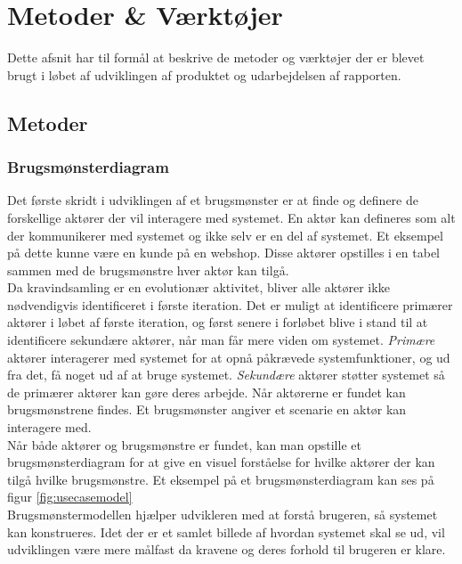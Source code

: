 \section{Metoder \& Værktøjer}
Dette afsnit har til formål at beskrive de metoder og værktøjer der er blevet brugt i løbet af udviklingen af produktet og udarbejdelsen af rapporten. 

\subsection{Metoder}
\subsubsection{Brugsmønsterdiagram}
Det første skridt i udviklingen af et brugsmønster er at finde og definere de forskellige aktører der vil interagere med systemet. En aktør kan defineres som alt der kommunikerer med systemet og ikke selv er en del af systemet. Et eksempel på dette kunne være en kunde på en webshop. Disse aktører opstilles i en tabel sammen med de brugsmønstre hver aktør kan tilgå. \\


Da kravindsamling er en evolutionær aktivitet, bliver alle aktører ikke nødvendigvis identificeret i første iteration. Det er muligt at identificere primærer aktører i løbet af første iteration, og først senere i forløbet blive i stand til at identificere sekundære aktører, når man får mere viden om systemet. \textit{Primære} aktører interagerer med systemet for at opnå påkrævede systemfunktioner, og ud fra det, få noget ud af at bruge systemet. \textit{Sekundære} aktører støtter systemet så de primærer aktører kan gøre deres arbejde. Når aktørerne er fundet kan brugsmønstrene findes. Et brugsmønster angiver et scenarie en aktør kan interagere med. \\


Når både aktører og brugsmønstre er fundet, kan man opstille et brugsmønsterdiagram for at give en visuel forståelse for hvilke aktører der kan tilgå hvilke brugsmønstre. Et eksempel på et brugsmønsterdiagram kan ses på figur \ref{fig:usecasemodel} \\


Brugsmønstermodellen hjælper udvikleren med at forstå brugeren, så systemet kan konstrueres. Idet der er et samlet billede af hvordan systemet skal se ud, vil udviklingen være mere målfast da kravene og deres forhold til brugeren er klare.



